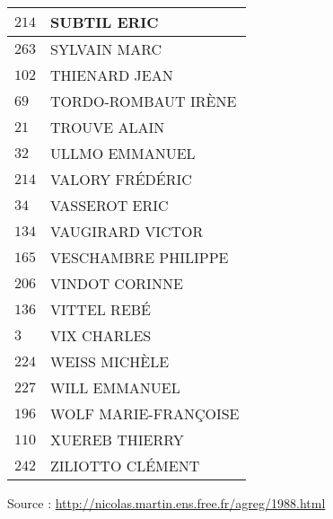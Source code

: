 \begin{xltabular}{\linewidth}{|l|X|}
    \hline
    $214$ & SUBTIL ERIC \\
    \hline
    $263$ & SYLVAIN MARC \\
    \hline
    $102$ & THIENARD JEAN \\
    \hline
    $69$ & TORDO-ROMBAUT IRÈNE \\
    \hline
    $21$ & TROUVE ALAIN \\
    \hline
    $32$ & ULLMO EMMANUEL \\
    \hline
    $214$ & VALORY FRÉDÉRIC \\
    \hline
    $34$ & VASSEROT ERIC \\
    \hline
    $134$ & VAUGIRARD VICTOR \\
    \hline
    $165$ & VESCHAMBRE PHILIPPE \\
    \hline
    $206$ & VINDOT CORINNE \\
    \hline
    $136$ & VITTEL REBÉ \\
    \hline
    $3$ & VIX CHARLES \\
    \hline
    $224$ & WEISS MICHÈLE \\
    \hline
    $227$ & WILL EMMANUEL \\
    \hline
    $196$ & WOLF MARIE-FRANÇOISE \\
    \hline
    $110$ & XUEREB THIERRY \\
    \hline
    $242$ & ZILIOTTO CLÉMENT \\
    \hline
  \end{xltabular}

  \begin{flushright}
    {\tiny Source : \url{http://nicolas.martin.ens.free.fr/agreg/1988.html}}
  \end{flushright}

